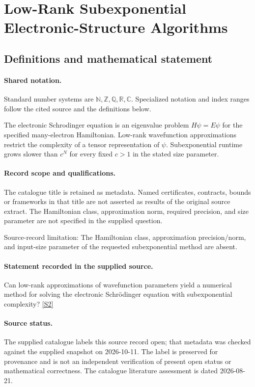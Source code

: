 \documentclass[11pt]{article}
\newcommand{\sref}[2]{\hyperlink{source:#1:#2}{[S#2]}}
\begin{document}
\section{Low-Rank Subexponential Electronic-Structure Algorithms}\label{statement}

\subsection{Definitions and mathematical statement}

\paragraph{Shared notation.}Standard number systems are $\mathbb N,\mathbb Z,\mathbb Q,\mathbb R,\mathbb C$. Specialized notation and index ranges follow the cited source and the definitions below.


The electronic Schrodinger equation is an eigenvalue problem $H\psi=E\psi$ for the specified many-electron Hamiltonian. Low-rank wavefunction approximations restrict the complexity of a tensor representation of $\psi$. Subexponential runtime grows slower than $c^N$ for every fixed $c>1$ in the stated size parameter.
\paragraph{Record scope and qualifications.}
The catalogue title is retained as metadata. Named certificates, contracts, bounds or frameworks in that title are not asserted as results of the original source extract.
The Hamiltonian class, approximation norm, required precision, and size parameter are not specified in the supplied question.

Source-record limitation: The Hamiltonian class, approximation precision/norm, and input-size parameter of the requested subexponential method are absent.
\paragraph{Statement recorded in the supplied source.}
Can low-rank approximations of wavefunction parameters yield a numerical method for solving the electronic Schrödinger equation with subexponential complexity? \sref{statement}{2}
\paragraph{Source status.}
The supplied catalogue labels this source record open; that metadata was checked against the supplied snapshot on 2026-10-11. The label is preserved for provenance and is not an independent verification of present open status or mathematical correctness. The catalogue literature assessment is dated 2026-08-21.
\end{document}
